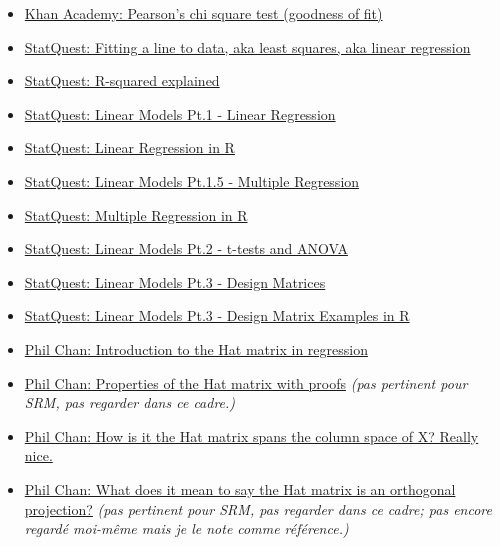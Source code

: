\documentclass[12pt, titlepage, french]{report}
\begin{document}
\begin{YTB_vids}
\begin{itemize}
	\item	\href{https://www.youtube.com/watch?v=2QeDRsxSF9M&t=369s}{Khan Academy: Pearson's chi square test (goodness of fit)}
	\item	\href{https://www.youtube.com/watch?v=PaFPbb66DxQ&list=PLblh5JKOoLUIzaEkCLIUxQFjPIlapw8nU&index=1}{StatQuest: Fitting a line to data, aka least squares, aka linear regression}
	\item	\href{https://www.youtube.com/watch?v=2AQKmw14mHM&list=PLblh5JKOoLUIzaEkCLIUxQFjPIlapw8nU&index=10}{StatQuest: R-squared explained}
	\item	\href{https://www.youtube.com/watch?v=nk2CQITm_eo&list=PLblh5JKOoLUIzaEkCLIUxQFjPIlapw8nU&index=2}{StatQuest: Linear Models Pt.1 - Linear Regression}
	\item	\href{https://www.youtube.com/watch?v=u1cc1r_Y7M0&list=PLblh5JKOoLUIzaEkCLIUxQFjPIlapw8nU&index=3}{StatQuest: Linear Regression in R}
	\item	\href{https://www.youtube.com/watch?v=zITIFTsivN8&list=PLblh5JKOoLUIzaEkCLIUxQFjPIlapw8nU&index=5}{StatQuest: Linear Models Pt.1.5 - Multiple Regression}
	\item	\href{https://www.youtube.com/watch?v=hokALdIst8k}{StatQuest: Multiple Regression in R}
	\item	\href{https://www.youtube.com/watch?v=NF5_btOaCig&list=PLblh5JKOoLUIzaEkCLIUxQFjPIlapw8nU&index=6}{StatQuest: Linear Models Pt.2 - t-tests and ANOVA}
	\item	\href{https://www.youtube.com/watch?v=CqLGvwi-5Pc&list=PLblh5JKOoLUIzaEkCLIUxQFjPIlapw8nU&index=7}{StatQuest: Linear Models Pt.3 - Design Matrices}
	\item	\href{https://www.youtube.com/watch?v=Hrr2anyK_5s&list=PLblh5JKOoLUIzaEkCLIUxQFjPIlapw8nU&index=8}{StatQuest: Linear Models Pt.3 - Design Matrix Examples in R}
	\tcbline
	\item	\href{https://www.youtube.com/watch?v=Z-jXJpVohiI}{Phil Chan: Introduction to the Hat matrix in regression}
	\item	\href{https://www.youtube.com/watch?v=eY-uOXQPXm8}{Phil Chan: Properties of the Hat matrix with proofs} \textit{(pas pertinent pour SRM, pas regarder dans ce cadre.)}
	\item	\href{https://www.youtube.com/watch?v=l2xG_yehq0k&t=146s}{Phil Chan: How is it the Hat matrix spans the column space of X? Really nice.}
	\item	\href{https://www.youtube.com/watch?v=-yIF_TXc6h0&t=96s}{Phil Chan: What does it mean to say the Hat matrix is an orthogonal projection?} \textit{(pas pertinent pour SRM, pas regarder dans ce cadre; pas encore regardé moi-même mais je le note comme référence.)}

\end{itemize}
\end{YTB_vids}
\end{document}
